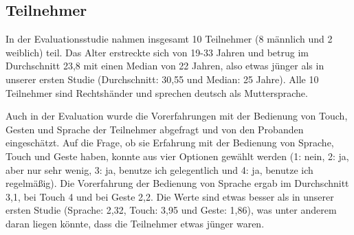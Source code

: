 \subsection[Teilnehmer]{Teilnehmer}
In der Evaluationsstudie nahmen insgesamt 10 Teilnehmer (8 männlich und 2 weiblich) teil. Das Alter erstreckte sich von 19-33 Jahren und betrug im Durchschnitt 23,8 mit einen Median von 22 Jahren, also etwas jünger als in unserer ersten Studie (Durchschnitt: 30,55 und Median: 25 Jahre). Alle 10 Teilnehmer sind Rechtshänder und sprechen deutsch als Muttersprache.

Auch in der Evaluation wurde die Vorerfahrungen mit der Bedienung von Touch, Gesten und Sprache der Teilnehmer abgefragt und von den Probanden eingeschätzt. Auf die Frage, ob sie Erfahrung mit der Bedienung von Sprache, Touch und Geste haben, konnte aus vier Optionen gewählt werden (1: nein, 2: ja, aber nur sehr wenig, 3: ja, benutze ich gelegentlich und 4: ja, benutze ich regelmäßig). Die Vorerfahrung der Bedienung von Sprache ergab im Durchschnitt 3,1, bei Touch 4 und bei Geste 2,2. Die Werte sind etwas besser als in unserer ersten Studie (Sprache: 2,32,  Touch: 3,95 und Geste: 1,86), was unter anderem daran liegen könnte, dass die Teilnehmer etwas jünger waren.

